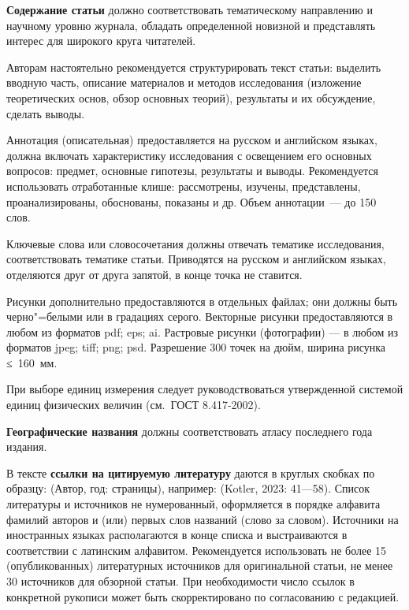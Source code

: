 \begin{multicols}{2}
    \textbf{Содержание статьи} должно соответствовать тематическому направлению и научному уровню журнала, обладать определенной новизной и представлять интерес для
    широкого круга читателей.

    Авторам настоятельно рекомендуется
    структурировать текст статьи: выделить
    вводную часть, описание материалов и методов исследования (изложение теоретических основ, обзор основных теорий), результаты и их обсуждение, сделать выводы.
    
    {Аннотация} (описательная) предоставляется на русском и английском языках,
    должна включать характеристику исследования с освещением его основных вопросов:
    предмет, основные гипотезы, результаты
    и выводы. Рекомендуется использовать отработанные клише: рассмотрены, изучены,
    представлены, проанализированы, обоснованы, показаны и др. Объем аннотации — 
    до 150 слов.
    
    {Ключевые слова} или словосочетания
    должны отвечать тематике исследования, соответствовать тематике статьи. Приводятся
    на русском и английском языках, отделяются
    друг от друга запятой, в конце точка не ставится.
    
    {Рисунки} дополнительно предоставляются в отдельных файлах; они должны
    быть черно"=белыми или в градациях серого.
    Векторные рисунки предоставляются в любом
    из форматов pdf; eps; ai. Растровые рисунки
    (фотографии) — в любом из форматов jpeg;
tiff; png; psd. Разрешение 300 точек на дюйм,
ширина рисунка ≤ 160 мм.

При выборе единиц измерения следует
руководствоваться утвержденной системой
единиц физических величин (см. ГОСТ
\mbox{8.417-2002}).

\textbf{Географические названия} должны соответствовать атласу последнего года издания.

В тексте \textbf{ссылки на цитируемую литературу} даются в круглых скобках по образцу:
(Автор, год: страницы), например: (Kotler,
2023: 41—58). Список литературы и источников не нумерованный, оформляется в порядке алфавита фамилий авторов и (или) первых слов названий (слово за словом). Источники на иностранных языках располагаются
в конце списка и выстраиваются в соответствии с латинским алфавитом. Рекомендуется
использовать не более 15 (опубликованных)
литературных источников для оригинальной
статьи, не менее 30 источников для обзорной
статьи. При необходимости число ссылок
в конкретной рукописи может быть скорректировано по согласованию с редакцией.


\end{multicols}
